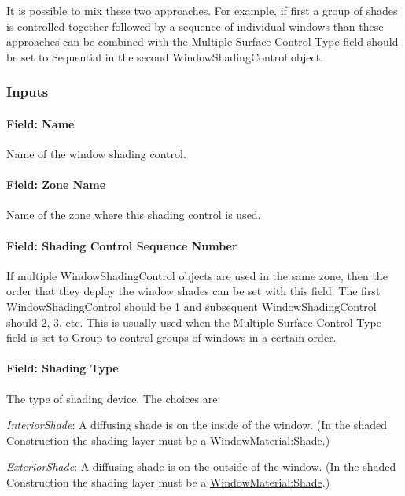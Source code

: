 It is possible to mix these two approaches. For example, if first a group of shades is controlled together followed by a sequence of individual windows than these approaches can be combined with the Multiple Surface Control Type field should be set to Sequential in the second WindowShadingControl object.

\subsubsection{Inputs}\label{inputs-32-001}

\paragraph{Field: Name}\label{field-name-29-001}

Name of the window shading control.

\paragraph{Field: Zone Name}\label{field-zone-name-29-001}

Name of the zone where this shading control is used.

\paragraph{Field: Shading Control Sequence Number}\label{shading-control-sequence-number}

If multiple WindowShadingControl objects are used in the same zone, then the order that they deploy the window shades can be set with this field. The first WindowShadingControl should be 1 and subsequent WindowShadingControl should 2, 3, etc. This is usually used when the Multiple Surface Control Type field is set to Group to control groups of windows in a certain order.

\paragraph{Field: Shading Type}\label{field-shading-type}

The type of shading device. The choices are:

\emph{InteriorShade}: A diffusing shade is on the inside of the window. (In the shaded Construction the shading layer must be a \hyperref[windowmaterialshade]{WindowMaterial:Shade}.)

\emph{ExteriorShade}: A diffusing shade is on the outside of the window. (In the shaded Construction the shading layer must be a \hyperref[windowmaterialshade]{WindowMaterial:Shade}.)

